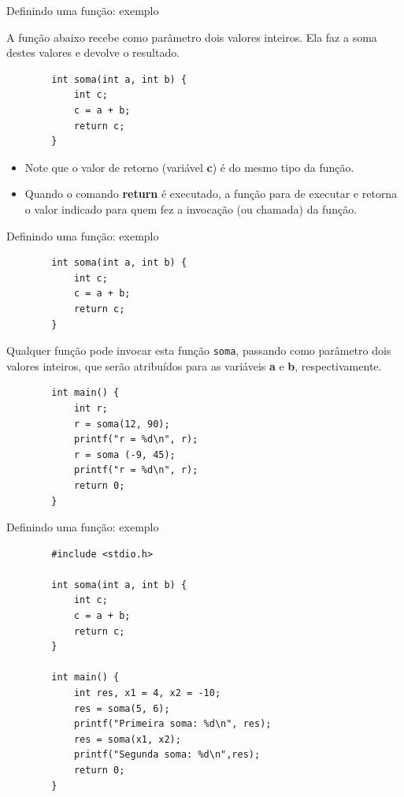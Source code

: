 \documentclass[handout]{beamer}
\newcommand{\cod}[1]{\texttt{#1}}
\begin{document}
\begin{frame}[fragile]{Definindo uma função: exemplo}

    A função abaixo recebe como parâmetro dois valores inteiros. 
    Ela faz a soma destes valores e devolve o resultado.

    \begin{verbatim}
        int soma(int a, int b) {
            int c;
            c = a + b;
            return c;
        }
    \end{verbatim}

    \begin{itemize}
        \item Note que o valor de retorno (variável {\bf c}) é do mesmo tipo da função.
        \item Quando o comando {\bf return} é executado, a função para de executar e retorna o valor indicado para quem fez a invocação (ou chamada) da função.
    \end{itemize}
\end{frame}

\begin{frame}[fragile]{Definindo uma função: exemplo}

    \begin{verbatim}
        int soma(int a, int b) {
            int c;
            c = a + b;
            return c;
        }
    \end{verbatim}

    \small
    Qualquer função pode invocar esta função \cod{soma}, passando como parâmetro dois valores inteiros, que serão atribuídos para as variáveis {\bf a} e {\bf b}, respectivamente.

    \begin{verbatim}
        int main() {
            int r;
            r = soma(12, 90);
            printf("r = %d\n", r);
            r = soma (-9, 45);
            printf("r = %d\n", r);
            return 0;
        }
    \end{verbatim}
\end{frame}

\begin{frame}[fragile]{Definindo uma função: exemplo}

    \begin{verbatim}
        #include <stdio.h>

        int soma(int a, int b) {
            int c;
            c = a + b;
            return c;
        }

        int main() {
            int res, x1 = 4, x2 = -10;
            res = soma(5, 6);
            printf("Primeira soma: %d\n", res);
            res = soma(x1, x2);
            printf("Segunda soma: %d\n",res);
            return 0;
        }
    \end{verbatim}
\end{frame}
\end{document}
